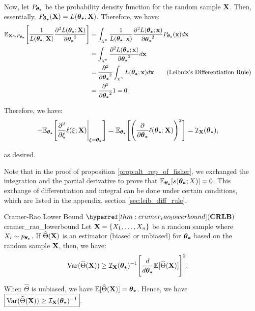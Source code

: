 \begin{proof*}
    \noindent Now, let $P_{\boldsymbol{\theta_*}}$ be the probability density function for the random sample ${\bf X}$. Then, essentially, $P_{\boldsymbol{\theta_*}}({\bf X}) = L(\boldsymbol{\theta_*};{\bf X})$. Therefore, we have:
    \begin{align*}
        \mathbb{E}_{{\bf X}\sim P_{\boldsymbol{\theta_*}}} \Bigg[ \frac{1}{L(\boldsymbol{\theta_*};{\bf X})}\frac{\partial^2 L(\boldsymbol{\theta_*};{\bf X})}{\partial\boldsymbol{\theta_*}^2} \Bigg] &= \int_{\chi^n} \frac{1}{L(\boldsymbol{\theta_*};{\bf x})}\frac{\partial^2 L(\boldsymbol{\theta_*};{\bf x})}{\partial\boldsymbol{\theta_*}^2} P_{\boldsymbol{\theta_*}}({\bf x}) d{\bf x} \\
        &= \int_{\chi^n}\frac{\partial^2 L(\boldsymbol{\theta_*};{\bf x})}{\partial\boldsymbol{\theta_*}^2} d{\bf x} \\
        &= \frac{\partial^2}{\partial\boldsymbol{\theta_*}^2}\int_{\chi^n} L(\boldsymbol{\theta_*};{\bf x})d{\bf x} \qquad \text{(Leibniz's Differentiation Rule)} \\
        &= \frac{\partial^2}{\partial\boldsymbol{\theta_*}^2} 1 = 0.
    \end{align*} 

    \noindent Therefore, we have:
    \begin{align*}
        -\mathbb{E}_{\boldsymbol{\theta_*}}\Bigg[ \frac{\partial^2}{\partial\xi}\ell(\xi;{\bf X})\Bigg|_{\xi=\boldsymbol{\theta_*}} \Bigg] = \mathbb{E}_{\boldsymbol{\theta_*}}\Bigg[ \Bigg( \frac{\partial}{\partial\boldsymbol{\theta_*}}\ell(\boldsymbol{\theta_*};{\bf X}) \Bigg)^2 \Bigg] = \mathcal{I}_{{\bf X}}(\boldsymbol{\theta_*}),
    \end{align*} 

    as desired.
\end{proof*} 

\begin{remark}
    Note that in the proof of proposition \ref{prop:alt_rep_of_fisher}, we exchanged the integration and the partial derivative to prove that $\mathbb{E}_{\boldsymbol{\theta_*}}[s(\boldsymbol{\theta_*};X)]=0$. This exchange of differentiation and integral can be done under certain conditions, which are listed in the appendix, section \ref{sec:leib_diff_rule}.
\end{remark}

\begin{theorem}{Cramer-Rao Lower Bound $\CRLB$}{cramer_rao_lowerbound}
    Let ${\bf X} = \{X_1, \dots, X_n\}$ be a random sample where $X_i \sim p_{\boldsymbol{\theta_*}}$. If $\widehat{\Theta}({\bf X})$ is an estimator (biased or unbiased) for $\boldsymbol{\theta_*}$ based on the random sample ${\bf X}$, then, we have:
    \begin{equation}
        \mathrm{Var}(\widehat{\Theta}({\bf X})) \ge \mathcal{I}_{{\bf X}}(\boldsymbol{\theta_*})^{-1}\Bigg[ \frac{d}{d\boldsymbol{\theta_*}}\mathbb{E}[\widehat{\Theta}({\bf X})] \Bigg]^2. 
    \end{equation} 

    \noindent When $\widehat{\Theta}$ is unbiased, we have $\mathbb{E}[\widehat{\Theta}({\bf X})] = \boldsymbol{\theta_*}$. Hence, we have $\boxed{\mathrm{Var}(\widehat{\Theta}({\bf X}))\ge\mathcal{I}_{{\bf X}}(\boldsymbol{\theta_*})^{-1}}$.
\end{theorem}

